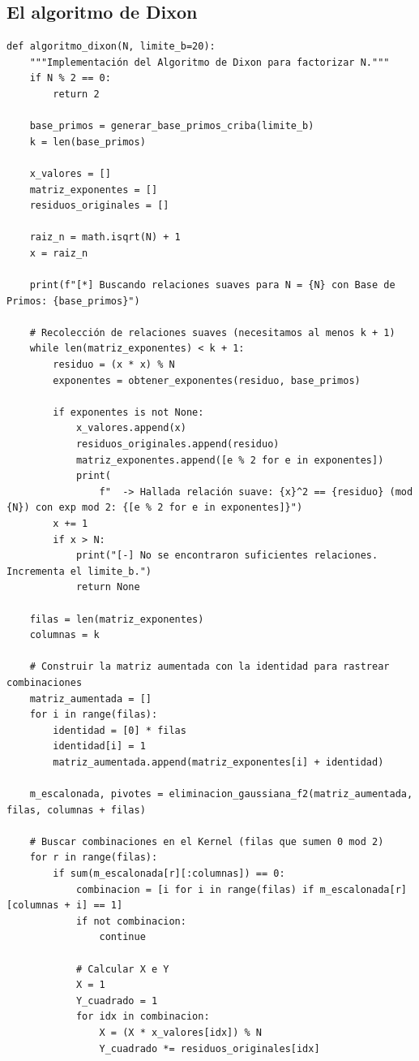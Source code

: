 \subsection{El algoritmo de Dixon}
\begin{verbatim}
def algoritmo_dixon(N, limite_b=20):
    """Implementación del Algoritmo de Dixon para factorizar N."""
    if N % 2 == 0:
        return 2

    base_primos = generar_base_primos_criba(limite_b)
    k = len(base_primos)

    x_valores = []
    matriz_exponentes = []
    residuos_originales = []

    raiz_n = math.isqrt(N) + 1
    x = raiz_n

    print(f"[*] Buscando relaciones suaves para N = {N} con Base de Primos: {base_primos}")

    # Recolección de relaciones suaves (necesitamos al menos k + 1)
    while len(matriz_exponentes) < k + 1:
        residuo = (x * x) % N
        exponentes = obtener_exponentes(residuo, base_primos)

        if exponentes is not None:
            x_valores.append(x)
            residuos_originales.append(residuo)
            matriz_exponentes.append([e % 2 for e in exponentes])
            print(
                f"  -> Hallada relación suave: {x}^2 == {residuo} (mod {N}) con exp mod 2: {[e % 2 for e in exponentes]}")
        x += 1
        if x > N:
            print("[-] No se encontraron suficientes relaciones. Incrementa el limite_b.")
            return None

    filas = len(matriz_exponentes)
    columnas = k

    # Construir la matriz aumentada con la identidad para rastrear combinaciones
    matriz_aumentada = []
    for i in range(filas):
        identidad = [0] * filas
        identidad[i] = 1
        matriz_aumentada.append(matriz_exponentes[i] + identidad)

    m_escalonada, pivotes = eliminacion_gaussiana_f2(matriz_aumentada, filas, columnas + filas)

    # Buscar combinaciones en el Kernel (filas que sumen 0 mod 2)
    for r in range(filas):
        if sum(m_escalonada[r][:columnas]) == 0:
            combinacion = [i for i in range(filas) if m_escalonada[r][columnas + i] == 1]
            if not combinacion:
                continue

            # Calcular X e Y
            X = 1
            Y_cuadrado = 1
            for idx in combinacion:
                X = (X * x_valores[idx]) % N
                Y_cuadrado *= residuos_originales[idx]


\end{verbatim}
